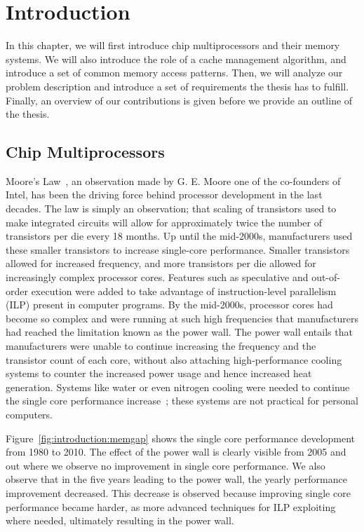 \chapter{Introduction}
\label{cpt:introduction}

In this chapter, we will first introduce chip multiprocessors and their memory systems.
We will also introduce the role of a cache management algorithm, and introduce a set of common memory access patterns.
Then, we will analyze our problem description and introduce a set of requirements the thesis has to fulfill.
Finally, an overview of our contributions is given before we provide an outline of the thesis.

\section{Chip Multiprocessors}

Moore's Law~\cite{Moore1998}, an observation made by G. E. Moore one of the co-founders of Intel, has been the driving force behind processor development in the last decades.
The law is simply an observation; that scaling of transistors used to make integrated circuits will allow for approximately twice the number of transistors per die every 18 months.
Up until the mid-2000s, manufacturers used these smaller transistors to increase single-core performance.
Smaller transistors allowed for increased frequency, and more transistors per die allowed for increasingly complex processor cores.
Features such as speculative and out-of-order execution were added to take advantage of instruction-level parallelism (ILP) present in computer programs.
By the mid-2000s, processor cores had become so complex and were running at such high frequencies that manufacturers had reached the limitation known as the power wall.
The power wall entails that manufacturers were unable to continue increasing the frequency and the transistor count of each core, without also attaching high-performance cooling systems to counter the increased power usage and hence increased heat generation.
Systems like water or even nitrogen cooling were needed to continue the single core performance increase~\cite{Sutter2005}; these systems are not practical for personal computers.

Figure~\ref{fig:introduction:memgap} shows the single core performance development from 1980 to 2010.
The effect of the power wall is clearly visible from 2005 and out where we observe no improvement in single core performance.
We also observe that in the five years leading to the power wall, the yearly performance improvement decreased.
This decrease is observed because improving single core performance became harder, as more advanced techniques for ILP exploiting where needed, ultimately resulting in the power wall.


